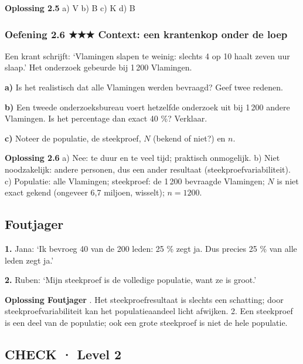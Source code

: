 \begin{oplossing}
\textbf{Oplossing 2.5} \quad a) V \quad b) B \quad c) K \quad d) B
\end{oplossing}

\subsubsection*{Oefening 2.6 \quad ★★★ \quad Context: een krantenkop onder de loep}

Een krant schrijft: ‘Vlamingen slapen te weinig: slechts 4 op 10 haalt zeven uur slaap.’ Het onderzoek gebeurde bij 1\,200 Vlamingen.

\textbf{a)} Is het realistisch dat alle Vlamingen werden bevraagd? Geef twee redenen. \lijn

\textbf{b)} Een tweede onderzoeksbureau voert hetzelfde onderzoek uit bij 1\,200 andere Vlamingen. Is het percentage dan exact 40 \%? Verklaar. \lijn

\textbf{c)} Noteer de populatie, de steekproef, $N$ (bekend of niet?) en $n$. \lijn

\begin{oplossing}
\textbf{Oplossing 2.6} \quad a) Nee: te duur en te veel tijd; praktisch onmogelijk. b) Niet noodzakelijk: andere personen, dus een ander resultaat (steekproefvariabiliteit). c) Populatie: alle Vlamingen; steekproef: de 1\,200 bevraagde Vlamingen; $N$ is niet exact gekend (ongeveer 6,7 miljoen, wisselt); $n=1200$.
\end{oplossing}

\subsection*{Foutjager}

\textbf{1.} Jana: ‘Ik bevroeg 40 van de 200 leden: 25 \% zegt ja. Dus precies 25 \% van alle leden zegt ja.’ \lijn

\textbf{2.} Ruben: ‘Mijn steekproef is de volledige populatie, want ze is groot.’ \lijn

\begin{oplossing}
\textbf{Oplossing Foutjager} . Het steekproefresultaat is slechts een schatting; door steekproefvariabiliteit kan het populatieaandeel licht afwijken. 2. Een steekproef is een deel van de populatie; ook een grote steekproef is niet de hele populatie.
\end{oplossing}

\subsection*{CHECK · Level 2}


